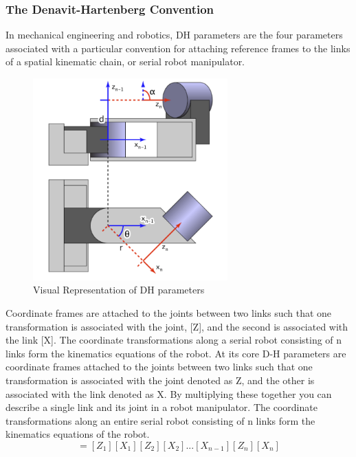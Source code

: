         \subsubsection{The Denavit-Hartenberg Convention}
            In mechanical engineering and robotics, DH parameters are the four parameters associated with a particular convention for attaching reference frames to the links of a spatial kinematic chain, or serial robot manipulator.
            \begin{figure}[H]
                \centering
                \includegraphics[width=75mm]{Dh.PNG}
                \caption{Visual Representation of DH parameters}
                \label{fig:DHParams_Visual}
            \end{figure}
            Coordinate frames are attached to the joints between two links such that one transformation is associated with the joint, [Z], and the second is associated with the link [X]. The coordinate transformations along a serial robot consisting of n links form the kinematics equations of the robot. At its core D-H parameters are coordinate frames attached to the joints between two links such that one transformation is associated with the joint denoted as Z, and the other is associated with the link denoted as X. By multiplying these together you can describe a single link and its joint in a robot manipulator. The coordinate transformations along an entire serial robot consisting of n links form the kinematics equations of the robot.
            \begin{equation}
            [T] = [Z_1][X_1][Z_2][X_2]...[X_{n-1}][Z_n][X_n]
            \end{equation}
